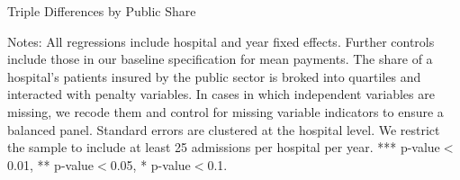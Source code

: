 \documentclass[12pt]{article}
\begin{document}
\newpage
{}
\setlength{\captionmargin}{.5 \textwidth} \addtolength{\captionmargin}{-.5\wd\gfxbox}
\begin{table}[!h]
\centering
\caption{Triple Differences by Public Share}
\label{tab:publicshare}
\usebox{\gfxbox}
\par
\begin{minipage}{\wd\gfxbox}
\footnotesize
Notes: All regressions include hospital and year fixed effects.  Further controls include those in our baseline specification for mean payments.  The share of a hospital's patients insured by the public sector is broked into quartiles and interacted with penalty variables.  In cases in which independent variables are missing, we recode them and control for missing variable indicators to ensure a balanced panel.  Standard errors are clustered at the hospital level.  We restrict the sample to include at least 25 admissions per hospital per year.  *** p-value$<$0.01, ** p-value$<$0.05, * p-value$<$0.1.
\end{minipage}
\end{table}
\end{document}
